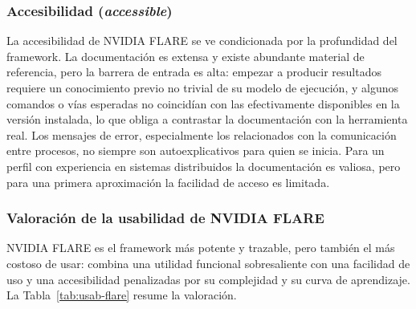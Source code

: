 \subsubsection{Accesibilidad (\textit{accessible})}\label{sec:usab-flare-accessible}

La accesibilidad de NVIDIA FLARE se ve condicionada por la profundidad del framework. La
documentación es extensa y existe abundante material de referencia, pero la barrera de
entrada es alta: empezar a producir resultados requiere un conocimiento previo no trivial de
su modelo de ejecución, y algunos comandos o vías esperadas no coincidían con las
efectivamente disponibles en la versión instalada, lo que obliga a contrastar la
documentación con la herramienta real. Los mensajes de error, especialmente los relacionados
con la comunicación entre procesos, no siempre son autoexplicativos para quien se inicia.
Para un perfil con experiencia en sistemas distribuidos la documentación es valiosa, pero
para una primera aproximación la facilidad de acceso es limitada.

\subsubsection{Valoración de la usabilidad de NVIDIA FLARE}\label{sec:usab-flare-valoracion}

NVIDIA FLARE es el framework más potente y trazable, pero también el más costoso de usar:
combina una utilidad funcional sobresaliente con una facilidad de uso y una accesibilidad
penalizadas por su complejidad y su curva de aprendizaje. La Tabla~\ref{tab:usab-flare}
resume la valoración.

\begin{table}[htbp]
  \centering
  \caption{Valoración de la usabilidad de NVIDIA FLARE según las cuatro dimensiones de la
  rúbrica (escala 1--5).}
  \label{tab:usab-flare}
\end{table}

